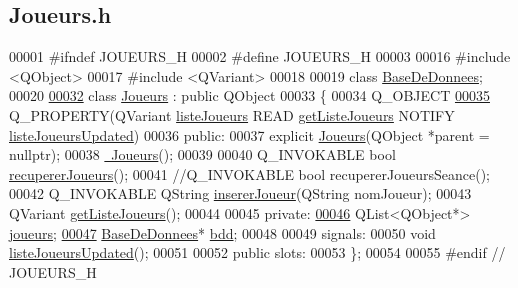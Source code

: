 \hypertarget{_joueurs_8h_source}{}\subsection{Joueurs.\+h}
\label{_joueurs_8h_source}

\begin{DoxyCode}
00001 \textcolor{preprocessor}{#ifndef JOUEURS\_H}
00002 \textcolor{preprocessor}{#define JOUEURS\_H}
00003 
00016 \textcolor{preprocessor}{#include <QObject>}
00017 \textcolor{preprocessor}{#include <QVariant>}
00018 
00019 \textcolor{keyword}{class }\hyperlink{class_base_de_donnees}{BaseDeDonnees};
00020 
\hyperlink{class_joueurs}{00032} \textcolor{keyword}{class }\hyperlink{class_joueurs}{Joueurs} : \textcolor{keyword}{public} QObject
00033 \{
00034     Q\_OBJECT
\hyperlink{class_joueurs_a809d64435e34f4f7f0218d4616b727c0}{00035}     Q\_PROPERTY(QVariant \hyperlink{class_joueurs_a809d64435e34f4f7f0218d4616b727c0}{listeJoueurs} READ \hyperlink{class_joueurs_aec63d4e2fe1bf7fbf33489c1a8d3bbbf}{getListeJoueurs} NOTIFY 
      \hyperlink{class_joueurs_a5df3ead7bec2c66c600ec53880afe035}{listeJoueursUpdated})
00036 \textcolor{keyword}{public}:
00037     \textcolor{keyword}{explicit} \hyperlink{class_joueurs_ac0f9bfbacdcda2622d7438d0445200e8}{Joueurs}(QObject *parent = \textcolor{keyword}{nullptr});
00038     \hyperlink{class_joueurs_ab2b4280d9ad7be92ef78c2ca15755318}{~Joueurs}();
00039 
00040     Q\_INVOKABLE \textcolor{keywordtype}{bool} \hyperlink{class_joueurs_a5bd70438c6624d8dca765e322285eb61}{recupererJoueurs}();
00041     \textcolor{comment}{//Q\_INVOKABLE bool recupererJoueursSeance();}
00042     Q\_INVOKABLE QString \hyperlink{class_joueurs_ad41325dbd0611773c6e9fd8a814be1b3}{insererJoueur}(QString nomJoueur);
00043     QVariant \hyperlink{class_joueurs_aec63d4e2fe1bf7fbf33489c1a8d3bbbf}{getListeJoueurs}();
00044 
00045 \textcolor{keyword}{private}:
\hyperlink{class_joueurs_a86c2a21b5a6b83f9a43f9a957a020fd7}{00046}     QList<QObject*> \hyperlink{class_joueurs_a86c2a21b5a6b83f9a43f9a957a020fd7}{joueurs};
\hyperlink{class_joueurs_ac060c3017311b67a97ed488ce2bb2332}{00047}     \hyperlink{class_base_de_donnees}{BaseDeDonnees}* \hyperlink{class_joueurs_ac060c3017311b67a97ed488ce2bb2332}{bdd};
00048 
00049 signals:
00050     \textcolor{keywordtype}{void} \hyperlink{class_joueurs_a5df3ead7bec2c66c600ec53880afe035}{listeJoueursUpdated}();
00051 
00052 \textcolor{keyword}{public} slots:
00053 \};
00054 
00055 \textcolor{preprocessor}{#endif // JOUEURS\_H}
\end{DoxyCode}
